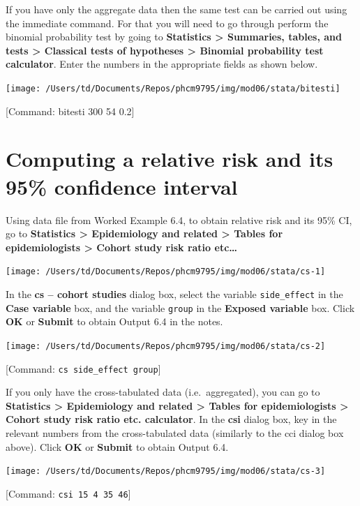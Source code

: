 \documentclass[
]{memoir}
\begin{document}
If you have only the aggregate data then the same test can be carried out using the immediate command. For that you will need to go through perform the binomial
probability test by going to \textbf{Statistics \textgreater{} Summaries, tables, and tests \textgreater{} Classical tests of hypotheses \textgreater{} Binomial probability test calculator}. Enter the numbers in the appropriate fields as shown below.

\texttt{[image: /Users/td/Documents/Repos/phcm9795/img/mod06/stata/bitesti]}

{[}Command: bitesti 300 54 0.2{]}

\hypertarget{computing-a-relative-risk-and-its-95-confidence-interval}{%
\section{Computing a relative risk and its 95\% confidence interval}\label{computing-a-relative-risk-and-its-95-confidence-interval}}

Using data file from Worked Example 6.4, to obtain relative risk and its 95\% CI, go to \textbf{Statistics \textgreater{} Epidemiology and related \textgreater{} Tables for epidemiologists \textgreater{} Cohort study risk ratio etc\ldots{}}

\texttt{[image: /Users/td/Documents/Repos/phcm9795/img/mod06/stata/cs-1]}

In the \textbf{cs -- cohort studies} dialog box, select the variable \texttt{side\_effect} in the \textbf{Case variable} box, and the variable \texttt{group} in the \textbf{Exposed variable} box. Click \textbf{OK} or \textbf{Submit} to obtain Output 6.4 in the notes.

\texttt{[image: /Users/td/Documents/Repos/phcm9795/img/mod06/stata/cs-2]}

{[}Command: \texttt{cs\ side\_effect\ group}{]}

If you only have the cross-tabulated data (i.e.~aggregated), you can go to \textbf{Statistics \textgreater{} Epidemiology and related \textgreater{} Tables for epidemiologists \textgreater{} Cohort study risk ratio etc. calculator}. In the \textbf{csi} dialog box, key in the relevant numbers from the cross-tabulated data (similarly to the cci dialog box above). Click \textbf{OK} or \textbf{Submit} to obtain Output 6.4.

\texttt{[image: /Users/td/Documents/Repos/phcm9795/img/mod06/stata/cs-3]}

{[}Command: \texttt{csi\ 15\ 4\ 35\ 46}{]}
\end{document}
